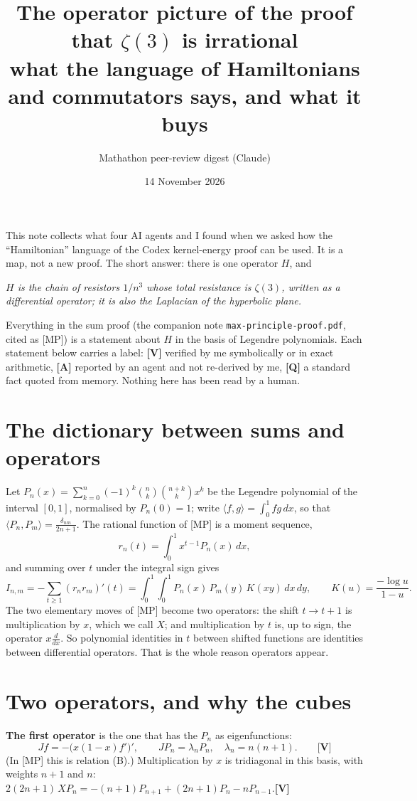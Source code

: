 \documentclass[11pt]{article}
\title{The operator picture of the proof that $\zeta(3)$ is irrational\\[2pt]
\large what the language of Hamiltonians and commutators says, and what it buys}
\author{Mathathon peer-review digest (Claude)}
\date{14 November 2026}
\newcommand{\ip}[2]{\langle #1,#2\rangle}
\newcommand{\q}[1]{\medskip\noindent\textbf{#1}}
\begin{document}
\maketitle

\noindent This note collects what four AI agents and I found when we asked how the ``Hamiltonian''
language of the Codex kernel-energy proof can be used. It is a map, not a new proof. The short
answer: there is one operator $H$, and
\begin{center}
\emph{$H$ is the chain of resistors $1/n^3$ whose total resistance is $\zeta(3)$, written as a
differential operator; it is also the Laplacian of the hyperbolic plane.}
\end{center}
Everything in the sum proof (the companion note \texttt{max-principle-proof.pdf}, cited as [MP]) is a
statement about $H$ in the basis of Legendre polynomials. Each statement below carries a label:
\textbf{[V]} verified by me symbolically or in exact arithmetic, \textbf{[A]} reported by an agent
and not re-derived by me, \textbf{[Q]} a standard fact quoted from memory. Nothing here has been
read by a human.

\section{The dictionary between sums and operators}

Let $P_n(x)=\sum_{k=0}^n(-1)^k\binom nk\binom{n+k}kx^k$ be the Legendre polynomial of the interval
$[0,1]$, normalised by $P_n(0)=1$; write $\ip fg=\int_0^1fg\,dx$, so that
$\ip{P_n}{P_m}=\frac{\delta_{nm}}{2n+1}$. The rational function of [MP] is a moment sequence,
\[
r_n(t)=\int_0^1x^{t-1}P_n(x)\,dx ,
\]
and summing over $t$ under the integral sign gives
\[
I_{n,m}=-\sum_{t\ge1}(r_nr_m)'(t)=\int_0^1\!\!\int_0^1P_n(x)\,P_m(y)\,K(xy)\,dx\,dy,\qquad
K(u)=\frac{-\log u}{1-u}.
\]
The two elementary moves of [MP] become two operators: the shift $t\to t+1$ is multiplication by
$x$, which we call $X$; and multiplication by $t$ is, up to sign, the operator $x\frac d{dx}$. So
polynomial identities in $t$ between shifted functions are identities between differential
operators. That is the whole reason operators appear.

\section{Two operators, and why the cubes}

\q{The first operator} is the one that has the $P_n$ as eigenfunctions:
\[
Jf=-\bigl(x(1-x)f'\bigr)',\qquad JP_n=\lambda_nP_n,\quad\lambda_n=n(n+1).\qquad\textbf{[V]}
\]
(In [MP] this is relation (B).) Multiplication by $x$ is tridiagonal in this basis, with weights
$n+1$ and $n$: \quad$2(2n+1)\,XP_n=-(n+1)P_{n+1}+(2n+1)P_n-nP_{n-1}$.\quad\textbf{[V]}
\end{document}
